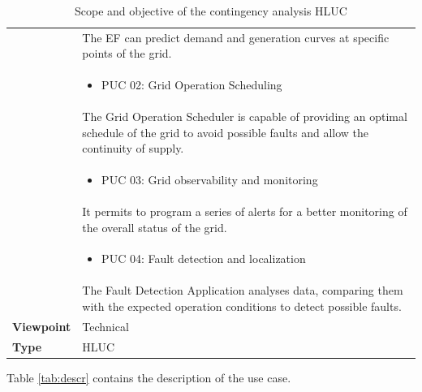 \begin{table}[!htb]
\begin{tabularx}{\linewidth}{|l|L|}
                                     & \vspace{-1cm} The EF can predict demand and generation curves at specific points of the grid. \\
                                     & \begin{itemize} \item PUC 02: Grid Operation Scheduling \end{itemize} \\
                                     & \vspace{-1cm} The Grid Operation Scheduler is capable of providing an optimal schedule of the grid to avoid possible faults and allow the continuity of supply. \\
                                     & \begin{itemize} \item PUC 03: Grid observability and monitoring \end{itemize} \\
                                     & \vspace{-1cm} It permits to program a series of alerts for a better monitoring of the overall status of the grid. \\
                                     & \begin{itemize} \item PUC 04: Fault detection and localization \end{itemize} \\
                                     & \vspace{-1cm} The Fault Detection Application analyses data, comparing them with the expected operation conditions to detect possible faults. \\
    \hline
\textbf{Viewpoint} & Technical \\
\hline
\textbf{Type} & HLUC \\
\hline
\end{tabularx}
\caption{Scope and objective of the contingency analysis HLUC}
\label{tab:scopee}
    \end{table}

Table \ref{tab:descr} contains the description of the use case.

